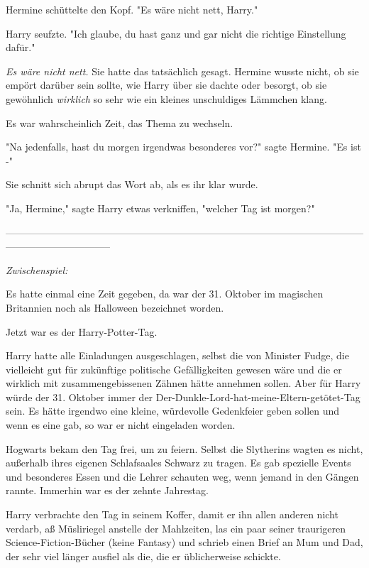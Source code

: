 {Hermine schüttelte den Kopf. "Es wäre nicht nett, Harry."

Harry seufzte. "Ich glaube, du hast ganz und gar nicht die richtige Einstellung dafür."

\emph{Es wäre nicht nett.} Sie hatte das tatsächlich gesagt. Hermine wusste nicht, ob sie empört darüber sein sollte, wie Harry über sie dachte oder besorgt, ob sie gewöhnlich \emph{wirklich} so sehr wie ein kleines unschuldiges Lämmchen klang.

Es war wahrscheinlich Zeit, das Thema zu wechseln.

"Na jedenfalls, hast du morgen irgendwas besonderes vor?" sagte Hermine. "Es ist -"

Sie schnitt sich abrupt das Wort ab, als es ihr klar wurde.

"Ja, Hermine," sagte Harry etwas verkniffen, "welcher Tag ist morgen?"

--------------------------------------------------------------------------------------------------------------------------------------------

\emph{Zwischenspiel:}

Es hatte einmal eine Zeit gegeben, da war der 31. Oktober im magischen Britannien noch als Halloween bezeichnet worden.

Jetzt war es der Harry-Potter-Tag.

Harry hatte alle Einladungen ausgeschlagen, selbst die von Minister Fudge, die vielleicht gut für zukünftige politische Gefälligkeiten gewesen wäre und die er wirklich mit zusammengebissenen Zähnen hätte annehmen sollen. Aber für Harry würde der 31. Oktober immer der Der-Dunkle-Lord-hat-meine-Eltern-getötet-Tag sein. Es hätte irgendwo eine kleine, würdevolle Gedenkfeier geben sollen und wenn es eine gab, so war er nicht eingeladen worden.

Hogwarts bekam den Tag frei, um zu feiern. Selbst die Slytherins wagten es nicht, außerhalb ihres eigenen Schlafsaales Schwarz zu tragen. Es gab spezielle Events und besonderes Essen und die Lehrer schauten weg, wenn jemand in den Gängen rannte. Immerhin war es der zehnte Jahrestag.

Harry verbrachte den Tag in seinem Koffer, damit er ihn allen anderen nicht verdarb, aß Müsliriegel anstelle der Mahlzeiten, las ein paar seiner traurigeren Science-Fiction-Bücher (keine Fantasy) und schrieb einen Brief an Mum und Dad, der sehr viel länger ausfiel als die, die er üblicherweise schickte.

}
